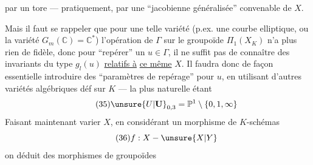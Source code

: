 par un tore --- pratiquement, par une ``jacobienne généralisée'' convenable de $X$.

Mais il faut se rappeler que pour une telle variété (p.ex. une courbe elliptique, ou la variété $G_m(\mathbb C)=\mathbb C^*$) l'opération de $\Gamma$ sur le groupoïde $\Pi_1(X_K)$ n'a plus rien de fidèle, donc pour ``repérer'' un $u\in\Gamma$, il ne suffit pas de connaître des invariants du type $g_l(u)$ \uline{relatifs à} \uline{ce même} $X$. Il faudra donc de façon essentielle introduire des ``paramètres de repérage'' pour $u$, en utilisant d'autres variétés algébriques déf sur $K$ --- la plus naturelle étant
\[
\tag{35}\unsure{U|\mathbf U}_{0,3}=\mathbb P^1\setminus\{0,1,\infty\}
\]
Faisant maintenant varier $X$, en considérant un morphisme de $K$-schémas
\[
\tag{36}f:X\mathbin{-}\unsure{X|Y}
\]
on déduit des morphismes de groupoïdes
